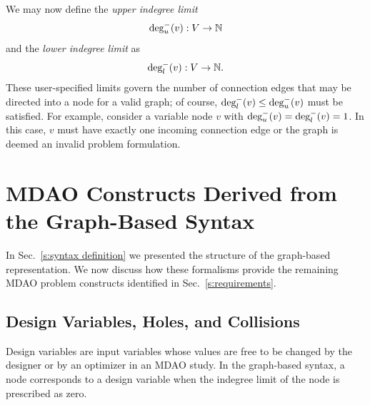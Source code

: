   We may now define the \emph{upper indegree limit} 
  \begin{equation}
  \textrm{deg}_u^-(v):V \to \mathbb{N}
  \end{equation} 
  and the \emph{lower indegree limit} as
  \begin{equation}
  \textrm{deg}_l^-(v):V \to \mathbb{N}.
  \end{equation}
  These user-specified limits govern the number of connection edges that may 
  be directed into a node for a valid graph; of course, $\textrm{deg}_l^-(v) \leq \textrm{deg}_u^-(v)$ must be satisfied. 
For example, consider a variable 
  node $v$ with $\textrm{deg}_u^-(v) = \textrm{deg}_l^-(v) = 1$. In this case, $v$ 
  must have exactly one incoming connection edge or the graph is deemed an invalid problem formulation. 

\section{MDAO Constructs Derived from the Graph-Based Syntax}
\label{s:graph representation}
In Sec.~\ref{s:syntax definition} we presented the structure of the graph-based representation. We now discuss how these formalisms provide the remaining MDAO problem constructs identified in Sec.~\ref{s:requirements}.


\subsection{Design Variables, Holes, and Collisions}
Design variables are input variables whose values are free to be 
changed by the designer or by an optimizer in an MDAO study. In the graph-based syntax, a node corresponds to a design variable when the indegree limit of the node is prescribed as zero.

